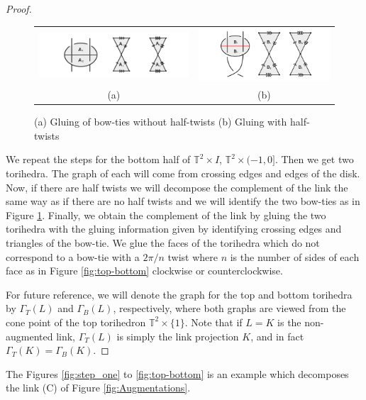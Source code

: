 \documentclass[11pt]{amsart}
\newcommand{\torus}{{\mathbb{T}^2}}
\theoremstyle{plain}
\theoremstyle{definition}
\begin{document}
\begin{proof}
\begin{figure}
 \centering
 \begin{tabular}{cc}
 \includegraphics [width=8cm]{falGluing1}&
 \includegraphics [width=7cm]{falGluing2}\\
 (a)&(b)
 \end{tabular}
	\caption{(a) Gluing of bow-ties without half-twists
	(b) Gluing with half-twists}
 \label{fig:falGluings}
 \end{figure}

\indent We repeat the steps for the bottom half of $\torus \times I$, $\torus \times
(-1,0]$. Then we get two torihedra. The graph of each will come from
crossing edges and edges of the disk. Now, if there are half twists we will
decompose the complement of the link the same way as if there are no half twists
and we will identify the two bow-ties as in Figure \ref{fig:falGluings}.
Finally,
we obtain the complement of the link by gluing the two torihedra with the gluing
information given by identifying crossing edges and triangles of the bow-tie. We
glue the faces of the torihedra which do not correspond to a bow-tie with a
$2\pi/n$ twist where $n$ is the number of sides of each face as in Figure
\ref{fig:top-bottom} clockwise or counterclockwise.


For future reference, we will denote the graph for the top and bottom
torihedra by $\Gamma_T(L)$ and $\Gamma_B(L)$, respectively,
where both graphs are viewed from the cone point of the top torihedron
$\torus \times \{1\}$.
Note that if $L = K$ is the non-augmented link,
$\Gamma_T(L)$ is simply the link projection $K$,
and in fact $\Gamma_T(K) = \Gamma_B(K)$.

\end{proof}


The Figures \ref{fig:step_one} to \ref{fig:top-bottom} is an example which decomposes the link (C) of Figure
\ref{fig:Augmentations}. 
\end{document}
